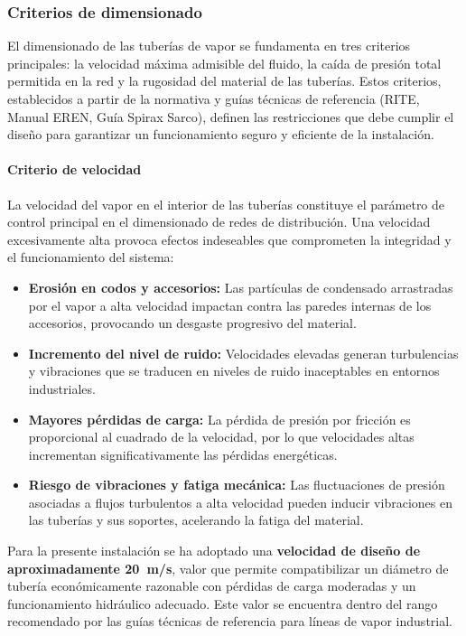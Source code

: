 \subsubsection{Criterios de dimensionado}
\label{subsubsec:criterios-dimensionado}

El dimensionado de las tuberías de vapor se fundamenta en tres criterios principales: la velocidad máxima admisible del fluido, la caída de presión total permitida en la red y la rugosidad del material de las tuberías. Estos criterios, establecidos a partir de la normativa y guías técnicas de referencia (RITE, Manual EREN, Guía Spirax Sarco), definen las restricciones que debe cumplir el diseño para garantizar un funcionamiento seguro y eficiente de la instalación.

\paragraph{Criterio de velocidad}

La velocidad del vapor en el interior de las tuberías constituye el parámetro de control principal en el dimensionado de redes de distribución. Una velocidad excesivamente alta provoca efectos indeseables que comprometen la integridad y el funcionamiento del sistema:

\begin{itemize}[leftmargin=2em]
	\item \textbf{Erosión en codos y accesorios:} Las partículas de condensado arrastradas por el vapor a alta velocidad impactan contra las paredes internas de los accesorios, provocando un desgaste progresivo del material.
	\item \textbf{Incremento del nivel de ruido:} Velocidades elevadas generan turbulencias y vibraciones que se traducen en niveles de ruido inaceptables en entornos industriales.
	\item \textbf{Mayores pérdidas de carga:} La pérdida de presión por fricción es proporcional al cuadrado de la velocidad, por lo que velocidades altas incrementan significativamente las pérdidas energéticas.
	\item \textbf{Riesgo de vibraciones y fatiga mecánica:} Las fluctuaciones de presión asociadas a flujos turbulentos a alta velocidad pueden inducir vibraciones en las tuberías y sus soportes, acelerando la fatiga del material.
\end{itemize}

Para la presente instalación se ha adoptado una \textbf{velocidad de diseño de aproximadamente 20~m/s}, valor que permite compatibilizar un diámetro de tubería económicamente razonable con pérdidas de carga moderadas y un funcionamiento hidráulico adecuado. Este valor se encuentra dentro del rango recomendado por las guías técnicas de referencia para líneas de vapor industrial.

